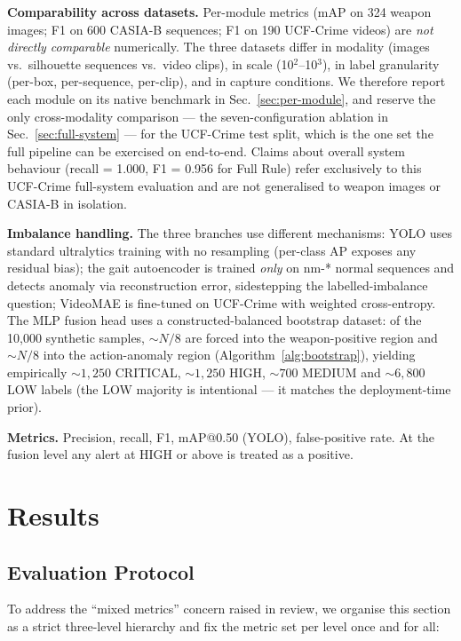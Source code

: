 \documentclass[runningheads]{llncs}
\begin{document}
\begin{algorithm}[!htbp]
\textbf{Comparability across datasets.} Per-module metrics (mAP on 324 weapon images; F1 on 600 CASIA-B sequences; F1 on 190 UCF-Crime videos) are \emph{not directly comparable} numerically. The three datasets differ in modality (images vs.\ silhouette sequences vs.\ video clips), in scale (10$^2$--10$^3$), in label granularity (per-box, per-sequence, per-clip), and in capture conditions. We therefore report each module on its native benchmark in Sec.~\ref{sec:per-module}, and reserve the only cross-modality comparison --- the seven-configuration ablation in Sec.~\ref{sec:full-system} --- for the UCF-Crime test split, which is the one set the full pipeline can be exercised on end-to-end. Claims about overall system behaviour (recall = 1.000, F1 = 0.956 for Full Rule) refer exclusively to this UCF-Crime full-system evaluation and are not generalised to weapon images or CASIA-B in isolation.

\textbf{Imbalance handling.} The three branches use different mechanisms: YOLO uses standard ultralytics training with no resampling (per-class AP exposes any residual bias); the gait autoencoder is trained \emph{only} on nm-* normal sequences and detects anomaly via reconstruction error, sidestepping the labelled-imbalance question; VideoMAE is fine-tuned on UCF-Crime with weighted cross-entropy. The MLP fusion head uses a constructed-balanced bootstrap dataset: of the 10{,}000 synthetic samples, $\sim N/8$ are forced into the weapon-positive region and $\sim N/8$ into the action-anomaly region (Algorithm~\ref{alg:bootstrap}), yielding empirically $\sim 1{,}250$ CRITICAL, $\sim 1{,}250$ HIGH, $\sim 700$ MEDIUM and $\sim 6{,}800$ LOW labels (the LOW majority is intentional --- it matches the deployment-time prior).

\textbf{Metrics.} Precision, recall, F1, mAP@0.50 (YOLO), false-positive rate. At the fusion level any alert at HIGH or above is treated as a positive.

\section{Results}\label{sec:results}

\subsection{Evaluation Protocol}\label{sec:eval-protocol}

To address the ``mixed metrics'' concern raised in review, we organise this section as a strict three-level hierarchy and fix the metric set per level once and for all:


\end{algorithm}
\end{document}
